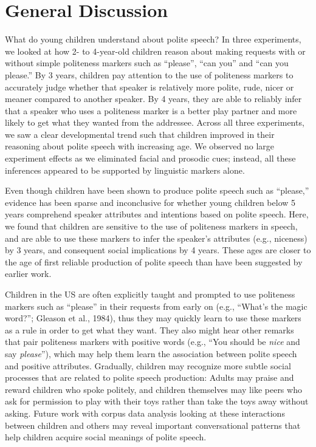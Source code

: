 \documentclass[10pt, letterpaper]{article}
\begin{document}
\section{General Discussion}\label{general-discussion}

What do young children understand about polite speech? In three
experiments, we looked at how 2- to 4-year-old children reason about
making requests with or without simple politeness markers such as
``please'', ``can you'' and ``can you please.'' By 3 years, children pay
attention to the use of politeness markers to accurately judge whether
that speaker is relatively more polite, rude, nicer or meaner compared
to another speaker. By 4 years, they are able to reliably infer that a
speaker who uses a politeness marker is a better play partner and more
likely to get what they wanted from the addressee. Across all three
experiments, we saw a clear developmental trend such that children
improved in their reasoning about polite speech with increasing age. We
observed no large experiment effects as we eliminated facial and
prosodic cues; instead, all these inferences appeared to be supported by
linguistic markers alone.

Even though children have been shown to produce polite speech such as
``please,'' evidence has been sparse and inconclusive for whether young
children below 5 years comprehend speaker attributes and intentions
based on polite speech. Here, we found that children are sensitive to
the use of politeness markers in speech, and are able to use these
markers to infer the speaker's attributes (e.g., niceness) by 3 years,
and consequent social implications by 4 years. These ages are closer to
the age of first reliable production of polite speech than have been
suggested by earlier work.

Children in the US are often explicitly taught and prompted to use
politeness markers such as ``please'' in their requests from early on
(e.g., ``What's the magic word?''; Gleason et al., 1984), thus they may
quickly learn to use these markers as a rule in order to get what they
want. They also might hear other remarks that pair politeness markers
with positive words (e.g., ``You should be \emph{nice} and say
\emph{please}''), which may help them learn the association between
polite speech and positive attributes. Gradually, children may recognize
more subtle social processes that are related to polite speech
production: Adults may praise and reward children who spoke politely,
and children themselves may like peers who ask for permission to play
with their toys rather than take the toys away without asking. Future
work with corpus data analysis looking at these interactions between
children and others may reveal important conversational patterns that
help children acquire social meanings of polite speech.
\end{document}
